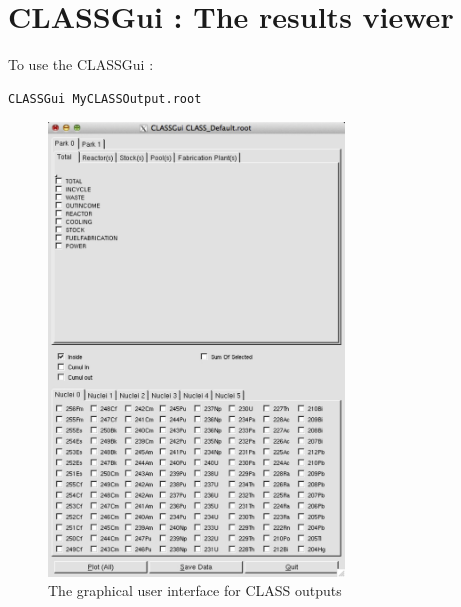 \documentclass[a4paper,11pt]{report}
\begin{document}
\thispagestyle{empty}
\titleGM %

\tableofcontents    %








\part{CLASSGui : The results viewer}
\label{part:GUI}
To use the CLASSGui :
\begin{center}
\begin{minipage}{\textwidth}
\begin{lstlisting}
CLASSGui MyCLASSOutput.root
\end{lstlisting}
\end{minipage}
\end{center}
\begin{figure}[h!]
\centering
\includegraphics[width=0.7\textwidth]{CLASSGui} 
\caption{The graphical user interface for CLASS outputs\label{fig:CLASSGui} }
\end{figure}
\end{document}
